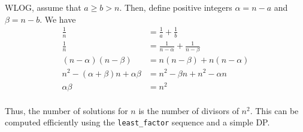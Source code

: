 \documentclass{article}
\begin{document}
WLOG, assume that $a\geq b>n$. Then, define positive integers $\alpha=n-a$ and $\beta=n-b$. We have
\begin{align*}
	\frac 1 n&=\frac 1 a+\frac 1 b\\
	\frac 1 n&=\frac{1}{n-\alpha}+\frac{1}{n-\beta}\\
	(n-\alpha)(n-\beta)&=n(n-\beta)+n(n-\alpha)\\
	n^2-(\alpha+\beta)n+\alpha\beta&=n^2-\beta n+n^2-\alpha n\\
	\alpha\beta&=n^2\\
\end{align*}

Thus, the number of solutions for $n$ is the number of divisors of $n^2$. This can be computed efficiently using the \texttt{least_factor} sequence and a simple DP. 
\end{document}

